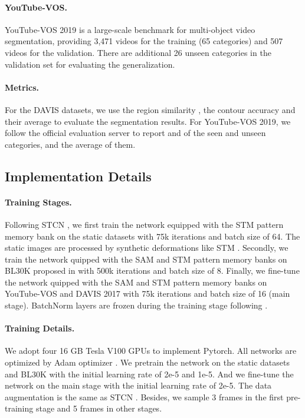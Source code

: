 \documentclass[10pt,twocolumn,letterpaper]{article}
\begin{document}
\paragraph{YouTube-VOS.} YouTube-VOS 2019 \cite{youtube} is a large-scale benchmark for multi-object video segmentation, providing 3,471 videos for the training (65 categories) and 507 videos for the validation. There are additional 26 unseen categories in the validation set for evaluating the generalization.
\vspace{-0.3em}
\paragraph{Metrics.}
For the DAVIS datasets, we use the region similarity , the contour accuracy  and their average  to evaluate the segmentation results. For YouTube-VOS 2019, we follow the official evaluation server to report   and  of the seen and unseen categories, and the average of them. 



\subsection{Implementation Details}
\paragraph{Training Stages.}
Following STCN \cite{cheng2021rethinking}, we first train the network equipped with the STM pattern memory bank on the static datasets \cite{wang2017learning,shi2015hierarchical,zeng2019towards,cheng2020cascadepsp,li2020fss} with 75k iterations and batch size of 64.  The static images are processed by synthetic deformations like STM \cite{oh2019video}. Secondly, we train the network quipped with the SAM and STM pattern memory banks on  BL30K \cite{chang2015shapenet,denninger2019blenderproc} proposed in \cite{cheng2021modular} with 500k iterations and batch size of 8. Finally, we fine-tune the network quipped with the SAM and STM pattern memory banks  on YouTube-VOS and DAVIS 2017 with 75k iterations and batch size of 16 (main stage). BatchNorm layers are frozen during the training stage following \cite{oh2019video}.
\vspace{-0.5em}
\paragraph{Training Details.} 
\label{sec:training details}
We adopt four 16 GB Tesla V100 GPUs to implement Pytorch. All networks are optimized by Adam optimizer \cite{kingma2014adam}. We pretrain the network on the static datasets and  BL30K  with the initial learning rate of 2e-5 and 1e-5. And we fine-tune the network on the main stage with the initial learning rate of 2e-5. The data augmentation is the same as STCN \cite{cheng2021rethinking}. Besides, we sample 3 frames in the first pre-training stage and 5 frames in other stages.
\vspace{-0.5em}
\end{document}
